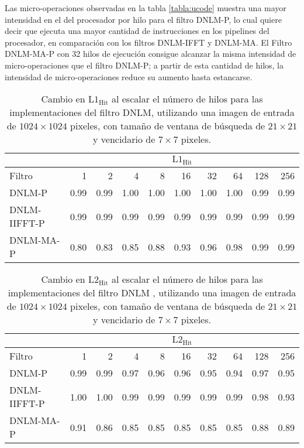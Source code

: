 Las micro-operaciones observadas en la tabla \ref{tabla:ucode} muestra una mayor intensidad en el  del procesador por hilo para el filtro DNLM-P, lo cual quiere decir que ejecuta una mayor cantidad de instrucciones en los pipelines del procesador, en comparaci\'on con los filtros DNLM-IFFT y DNLM-MA. El Filtro DNLM-MA-P  con 32 hilos de ejecuci\'on consigue alcanzar la misma intensidad de micro-operaciones que el filtro DNLM-P; a partir de esta cantidad de hilos, la intensidad de micro-operaciones reduce su aumento hasta estancarse. 

\begin{table}
\centering
\caption[Cambio en la raz\'on de aciertos de lectura en cach\'e L1 al escalar el n\'umero de hilos]{Cambio en  $\text{L1}_{\text{Hit}}$ al escalar el n\'umero de hilos para las implementaciones del filtro DNLM, utilizando una imagen de entrada de $1024 \times 1024$ pixeles, con tama\~no de ventana de búsqueda de $21 \times 21$ y vencidario de $7 \times 7$ pixeles. \label{tabla:l1_hit}}
\begin{tabular}{lrrrrrrrrr}
& \multicolumn{9}{c}{$\text{L1}_{\text{Hit}}$} \tabularnewline
\hline
 Filtro & 1 & 2 & 4 & 8 & 16 & 32 & 64 & 128 & 256 \tabularnewline
\hline
DNLM-P & 0.99 & 0.99 & 1.00 & 1.00 & 1.00 & 1.00 & 1.00 & 0.99 & 0.99 \tabularnewline
DNLM-IIFFT-P & 0.99 & 0.99 & 0.99 & 0.99 & 0.99 & 0.99 & 0.99 & 0.99 & 0.99 \tabularnewline
DNLM-MA-P & 0.80 & 0.83 & 0.85 & 0.88 & 0.93 & 0.96 & 0.98 & 0.99 & 0.99 \tabularnewline
\end{tabular}
\end{table}


\begin{table}
\centering
\caption[Cambio en la raz\'on de aciertos de lectura en cach\'e L2 al escalar el n\'umero de hilos]{Cambio en  $\text{L2}_{\text{Hit}}$ al escalar el n\'umero de hilos para las implementaciones del filtro DNLM , utilizando una imagen de entrada de $1024 \times 1024$ pixeles, con tama\~no de ventana de búsqueda de $21 \times 21$ y vencidario de $7 \times 7$ pixeles. \label{tabla:l2_hit}}
\begin{tabular}{lrrrrrrrrr}
& \multicolumn{9}{c}{$\text{L2}_{\text{Hit}}$} \tabularnewline
\hline
 Filtro & 1 & 2 & 4 & 8 & 16 & 32 & 64 & 128 & 256 \tabularnewline
\hline
DNLM-P & 0.99 & 0.99 & 0.97 & 0.96 & 0.96 & 0.95 & 0.94 & 0.97 & 0.95 \tabularnewline
DNLM-IIFFT-P & 1.00 & 1.00 & 0.99 & 0.99 & 0.99 & 0.99 & 0.99 & 0.98 & 0.93 \tabularnewline
DNLM-MA-P & 0.91 & 0.86 & 0.85 & 0.85 & 0.85 & 0.85 & 0.85 & 0.88 & 0.89 \tabularnewline
\end{tabular}
\end{table}


